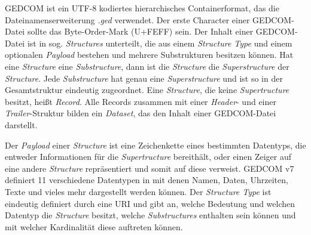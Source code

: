 GEDCOM ist ein UTF-8 kodiertes hierarchisches Containerformat, das die Dateinamenserweiterung \textit{.ged} verwendet. Der erste Character einer GEDCOM-Datei sollte das Byte-Order-Mark (U+FEFF) sein. Der Inhalt einer GEDCOM-Datei ist in sog. \textit{Structures} unterteilt, die aus einem \textit{Structure Type} und einem optionalen \textit{Payload} bestehen und mehrere Substrukturen besitzen können. Hat eine \textit{Structure} eine \textit{Substructure}, dann ist die \textit{Structure} die \textit{Superstructure} der \textit{Structure}. Jede \textit{Substructure} hat genau eine \textit{Superstructure} und ist so in der Gesamtstruktur eindeutig zugeordnet. Eine \textit{Structure}, die keine \textit{Supertructure} besitzt, heißt \textit{Record}. Alle Records zusammen mit einer \textit{Header}- und einer \textit{Trailer}-Struktur bilden ein \textit{Dataset}, das den Inhalt einer GEDCOM-Datei darstellt. \cite{GEDCOM} 

Der \textit{Payload} einer \textit{Structure} ist eine Zeichenkette eines bestimmten Datentyps, die entweder Informationen für die \textit{Supertructure} bereithält, oder einen Zeiger auf eine andere \textit{Structure} repräsentiert und somit auf diese verweist. GEDCOM v7 definiert 11 verschiedene Datentypen in \cite{GEDCOM} mit denen Namen, Daten, Uhrzeiten, Texte und vieles mehr dargestellt werden können. Der \textit{Structure Type} ist eindeutig definiert durch eine URI und gibt an, welche Bedeutung und welchen Datentyp die \textit{Structure} besitzt, welche \textit{Substructures} enthalten sein können und mit welcher Kardinalität diese auftreten können. \cite{GEDCOM} 

